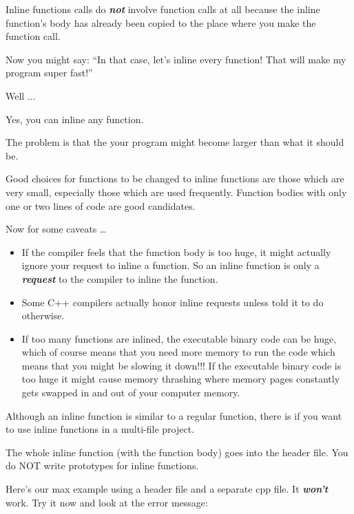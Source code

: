 Inline functions calls do \textbf{\textit{not}} involve function calls at all because the inline function's body has already been copied to the place where you make the function call.


\newpage{}

Now you might say: ``In that case, let's inline every function! That will make my program super fast!''

Well ...

Yes, you can inline any function.

The problem is that the your program might become larger than what it should be.

Good choices for functions to be changed to inline functions are those which are very small, especially those which are used frequently. Function bodies with only one or two lines of code are good candidates.

Now for some caveats \ldots{}

\begin{itemize}
\item If the compiler feels that the function body is too huge, it might
  actually ignore your request to inline a function. So an inline
  function is only a \textbf{\textit{request}} to the compiler to inline
  the function.
\item Some C++ compilers actually honor inline requests unless told it to do
  otherwise.
\item If too many functions are inlined, the executable binary code can be
  huge, which of course means that you need more memory to run the code
  which means that you might be slowing it down!!! If the executable
  binary code is too huge it might cause memory thrashing where memory
  pages constantly gets swapped in and out of your computer memory.
\end{itemize}


\newpage{}

Although an inline function is similar to a regular function, there is  if you want to use inline functions in a multi-file project.

The whole inline function (with the function body) goes into the header file. You do NOT write prototypes for inline functions.

Here's our max example using a header file and a separate cpp file. It \textbf{\textit{won't}} work. Try it now and look at the error message:

